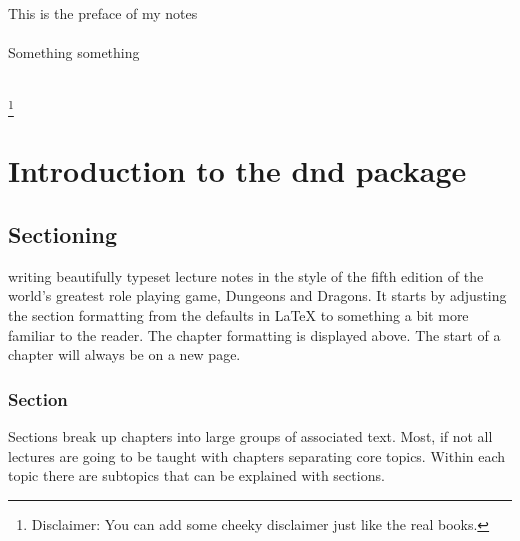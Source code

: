\documentclass[letterpaper,10pt,twoside,onecolumn,openany,draft]{book}
\begin{document}
\frontmatter                           
\begin{titlepage}	    
  ~
  \newpage

  \begin{center}


    \large
    \vspace*{\fill}
    This is the preface of my notes
    \\~\\ 
    Something something
    \\~\\
    \vspace*{\fill}

  \end{center}
  \let\thefootnote\relax\footnote{Disclaimer: You can add some cheeky disclaimer just like the real books.}
\end{titlepage}

\tableofcontents

\mainmatter

\twocolumn
\part{Introduction to the dnd package}

\chapter{Sectioning}
writing beautifully typeset lecture notes in the style of the fifth edition of the world's greatest role playing game, Dungeons and Dragons.
It starts by adjusting the section formatting from the defaults in \LaTeX{} to something a bit more familiar to the reader. 
The chapter formatting is displayed above. 
The start of a chapter will always be on a new page. 

\section{Section}
Sections break up chapters into large groups of associated text. Most, if not all lectures are going to be taught with chapters separating core topics. Within each topic there are subtopics that can be explained with sections. 
\end{document}
